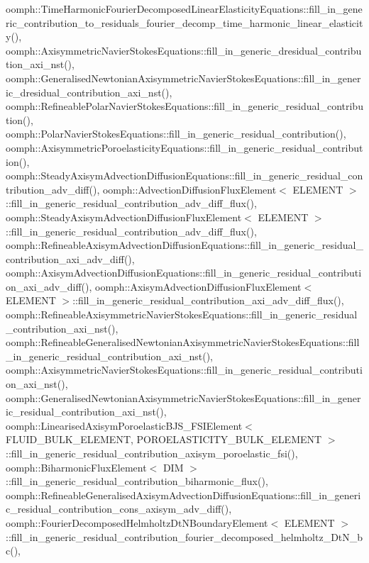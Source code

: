 oomph\+::\+Time\+Harmonic\+Fourier\+Decomposed\+Linear\+Elasticity\+Equations\+::fill\+\_\+in\+\_\+generic\+\_\+contribution\+\_\+to\+\_\+residuals\+\_\+fourier\+\_\+decomp\+\_\+time\+\_\+harmonic\+\_\+linear\+\_\+elasticity(), oomph\+::\+Axisymmetric\+Navier\+Stokes\+Equations\+::fill\+\_\+in\+\_\+generic\+\_\+dresidual\+\_\+contribution\+\_\+axi\+\_\+nst(), oomph\+::\+Generalised\+Newtonian\+Axisymmetric\+Navier\+Stokes\+Equations\+::fill\+\_\+in\+\_\+generic\+\_\+dresidual\+\_\+contribution\+\_\+axi\+\_\+nst(), oomph\+::\+Refineable\+Polar\+Navier\+Stokes\+Equations\+::fill\+\_\+in\+\_\+generic\+\_\+residual\+\_\+contribution(), oomph\+::\+Polar\+Navier\+Stokes\+Equations\+::fill\+\_\+in\+\_\+generic\+\_\+residual\+\_\+contribution(), oomph\+::\+Axisymmetric\+Poroelasticity\+Equations\+::fill\+\_\+in\+\_\+generic\+\_\+residual\+\_\+contribution(), oomph\+::\+Steady\+Axisym\+Advection\+Diffusion\+Equations\+::fill\+\_\+in\+\_\+generic\+\_\+residual\+\_\+contribution\+\_\+adv\+\_\+diff(), oomph\+::\+Advection\+Diffusion\+Flux\+Element$<$ E\+L\+E\+M\+E\+N\+T $>$\+::fill\+\_\+in\+\_\+generic\+\_\+residual\+\_\+contribution\+\_\+adv\+\_\+diff\+\_\+flux(), oomph\+::\+Steady\+Axisym\+Advection\+Diffusion\+Flux\+Element$<$ E\+L\+E\+M\+E\+N\+T $>$\+::fill\+\_\+in\+\_\+generic\+\_\+residual\+\_\+contribution\+\_\+adv\+\_\+diff\+\_\+flux(), oomph\+::\+Refineable\+Axisym\+Advection\+Diffusion\+Equations\+::fill\+\_\+in\+\_\+generic\+\_\+residual\+\_\+contribution\+\_\+axi\+\_\+adv\+\_\+diff(), oomph\+::\+Axisym\+Advection\+Diffusion\+Equations\+::fill\+\_\+in\+\_\+generic\+\_\+residual\+\_\+contribution\+\_\+axi\+\_\+adv\+\_\+diff(), oomph\+::\+Axisym\+Advection\+Diffusion\+Flux\+Element$<$ E\+L\+E\+M\+E\+N\+T $>$\+::fill\+\_\+in\+\_\+generic\+\_\+residual\+\_\+contribution\+\_\+axi\+\_\+adv\+\_\+diff\+\_\+flux(), oomph\+::\+Refineable\+Axisymmetric\+Navier\+Stokes\+Equations\+::fill\+\_\+in\+\_\+generic\+\_\+residual\+\_\+contribution\+\_\+axi\+\_\+nst(), oomph\+::\+Refineable\+Generalised\+Newtonian\+Axisymmetric\+Navier\+Stokes\+Equations\+::fill\+\_\+in\+\_\+generic\+\_\+residual\+\_\+contribution\+\_\+axi\+\_\+nst(), oomph\+::\+Axisymmetric\+Navier\+Stokes\+Equations\+::fill\+\_\+in\+\_\+generic\+\_\+residual\+\_\+contribution\+\_\+axi\+\_\+nst(), oomph\+::\+Generalised\+Newtonian\+Axisymmetric\+Navier\+Stokes\+Equations\+::fill\+\_\+in\+\_\+generic\+\_\+residual\+\_\+contribution\+\_\+axi\+\_\+nst(), oomph\+::\+Linearised\+Axisym\+Poroelastic\+B\+J\+S\+\_\+\+F\+S\+I\+Element$<$ F\+L\+U\+I\+D\+\_\+\+B\+U\+L\+K\+\_\+\+E\+L\+E\+M\+E\+N\+T, P\+O\+R\+O\+E\+L\+A\+S\+T\+I\+C\+I\+T\+Y\+\_\+\+B\+U\+L\+K\+\_\+\+E\+L\+E\+M\+E\+N\+T $>$\+::fill\+\_\+in\+\_\+generic\+\_\+residual\+\_\+contribution\+\_\+axisym\+\_\+poroelastic\+\_\+fsi(), oomph\+::\+Biharmonic\+Flux\+Element$<$ D\+I\+M $>$\+::fill\+\_\+in\+\_\+generic\+\_\+residual\+\_\+contribution\+\_\+biharmonic\+\_\+flux(), oomph\+::\+Refineable\+Generalised\+Axisym\+Advection\+Diffusion\+Equations\+::fill\+\_\+in\+\_\+generic\+\_\+residual\+\_\+contribution\+\_\+cons\+\_\+axisym\+\_\+adv\+\_\+diff(), oomph\+::\+Fourier\+Decomposed\+Helmholtz\+Dt\+N\+Boundary\+Element$<$ E\+L\+E\+M\+E\+N\+T $>$\+::fill\+\_\+in\+\_\+generic\+\_\+residual\+\_\+contribution\+\_\+fourier\+\_\+decomposed\+\_\+helmholtz\+\_\+\+Dt\+N\+\_\+bc(), 